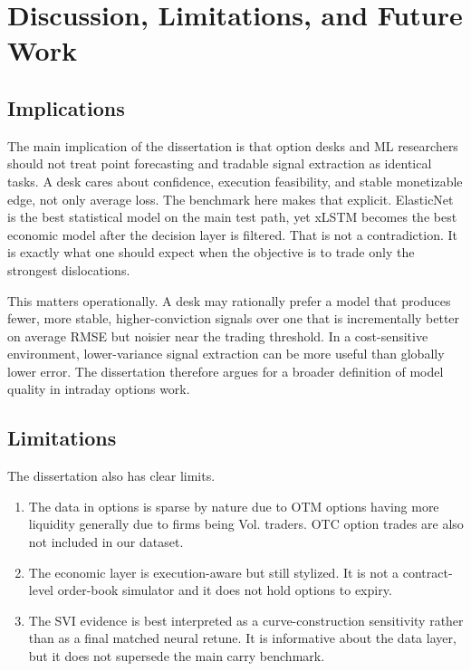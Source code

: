 \documentclass[12pt]{report}
\begin{document}
\chapter{Discussion, Limitations, and Future Work}

\section{Implications}
The main implication of the dissertation is that option desks and ML researchers should not treat point forecasting and tradable signal extraction as identical tasks. A desk cares about confidence, execution feasibility, and stable monetizable edge, not only average loss. The benchmark here makes that explicit. ElasticNet is the best statistical model on the main test path, yet xLSTM becomes the best economic model after the decision layer is filtered. That is not a contradiction. It is exactly what one should expect when the objective is to trade only the strongest dislocations.

This matters operationally. A desk may rationally prefer a model that produces fewer, more stable, higher-conviction signals over one that is incrementally better on average RMSE but noisier near the trading threshold. In a cost-sensitive environment, lower-variance signal extraction can be more useful than globally lower error. The dissertation therefore argues for a broader definition of model quality in intraday options work.

\section{Limitations}
The dissertation also has clear limits.
\begin{enumerate}[leftmargin=1.3cm]
    \item The data in options is sparse by nature due to OTM options having more liquidity generally due to firms being Vol. traders. OTC option trades are also not included in our dataset.
    \item The economic layer is execution-aware but still stylized. It is not a contract-level order-book simulator and it does not hold options to expiry.
    \item The SVI evidence is best interpreted as a curve-construction sensitivity rather than as a final matched neural retune. It is informative about the data layer, but it does not supersede the main carry benchmark.
\end{enumerate}
\end{document}
